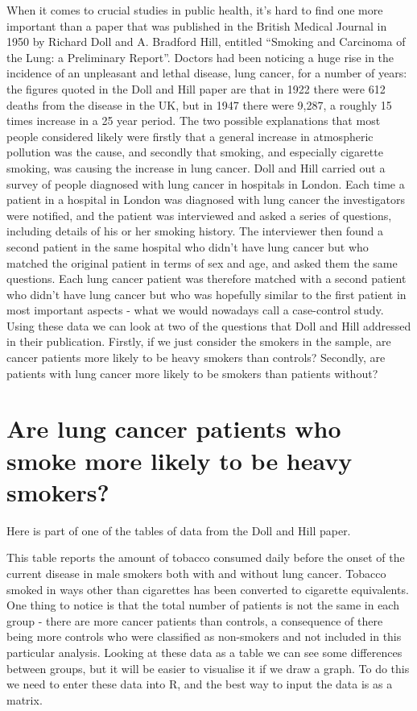 \documentclass[
]{book}
\begin{document}
When it comes to crucial studies in public health, it's hard to find one more important than a paper that was published in the British Medical Journal in 1950 by Richard Doll and A. Bradford Hill, entitled ``Smoking and Carcinoma of the Lung: a Preliminary Report''. Doctors had been noticing a huge rise in the incidence of an unpleasant and lethal disease, lung cancer, for a number of years: the figures quoted in the Doll and Hill paper are that in 1922 there were 612 deaths from the disease in the UK, but in 1947 there were 9,287, a roughly 15 times increase in a 25 year period. The two possible explanations that most people considered likely were firstly that a general increase in atmospheric pollution was the cause, and secondly that smoking, and especially cigarette smoking, was causing the increase in lung cancer. Doll and Hill carried out a survey of people diagnosed with lung cancer in hospitals in London. Each time a patient in a hospital in London was diagnosed with lung cancer the investigators were notified, and the patient was interviewed and asked a series of questions, including details of his or her smoking history. The interviewer then found a second patient in the same hospital who didn't have lung cancer but who matched the original patient in terms of sex and age, and asked them the same questions. Each lung cancer patient was therefore matched with a second patient who didn't have lung cancer but who was hopefully similar to the first patient in most important aspects - what we would nowadays call a case-control study.
Using these data we can look at two of the questions that Doll and Hill addressed in their publication. Firstly, if we just consider the smokers in the sample, are cancer patients more likely to be heavy smokers than controls? Secondly, are patients with lung cancer more likely to be smokers than patients without?

\hypertarget{are-lung-cancer-patients-who-smoke-more-likely-to-be-heavy-smokers}{%
\section{Are lung cancer patients who smoke more likely to be heavy smokers?}\label{are-lung-cancer-patients-who-smoke-more-likely-to-be-heavy-smokers}}

Here is part of one of the tables of data from the Doll and Hill paper.

This table reports the amount of tobacco consumed daily before the onset of the current disease in male smokers both with and without lung cancer. Tobacco smoked in ways other than cigarettes has been converted to cigarette equivalents. One thing to notice is that the total number of patients is not the same in each group - there are more cancer patients than controls, a consequence of there being more controls who were classified as non-smokers and not included in this particular analysis.
Looking at these data as a table we can see some differences between groups, but it will be easier to visualise it if we draw a graph. To do this we need to enter these data into R, and the best way to input the data is as a matrix.
\end{document}
